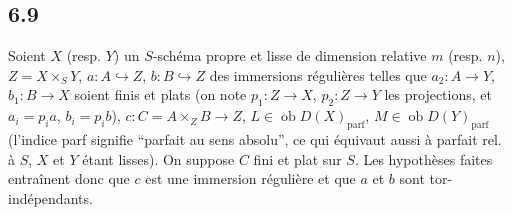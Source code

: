 \documentclass[11pt]{article}
\newcommand{\ob}{\operatorname{ob}}
\providecommand{\parf}{\mathrm{parf}}
\providecommand{\ob}{\operatorname{ob}}
\begin{document}
\subsection*{6.9}

Soient $X$ (resp. $Y$) un $S$-schéma propre et lisse de dimension relative $m$ (resp. $n$), $Z=X\times_S Y$, $a:A\hookrightarrow Z$, $b:B\hookrightarrow Z$ des immersions régulières telles que $a_2:A\to Y$, $b_1:B\to X$ soient finis et plats (on note $p_1:Z\to X$, $p_2:Z\to Y$ les projections, et $a_i=p_i a$, $b_i=p_i b$), $c:C=A\times_Z B\to Z$, $L\in\ob D(X)_{\parf}$, $M\in\ob D(Y)_{\parf}$ (l'indice parf signifie ``parfait au sens absolu'', ce qui équivaut aussi à parfait rel. à $S$, $X$ et $Y$ étant lisses). On suppose $C$ fini et plat sur $S$. Les hypothèses faites entraînent donc que $c$ est une immersion régulière et que $a$ et $b$ sont tor-indépendants.
\end{document}

